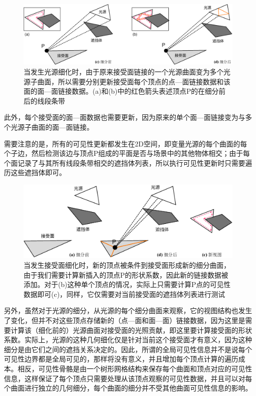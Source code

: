 \begin{figure}
\begin{fullwidth}
\includegraphics[width=\thewidth]{figures/r/source-refinement}
	\caption{当发生光源细化时，由于原来接受面链接的一个光源曲面变为多个光源子曲面，所以需要分别更新接受面每个顶点的点—面链接数据和该面的面—面链接数据。(a)和(b)中的红色箭头表述顶点P的在细分前后的线段条带}
	\label{f:r-source-refinement}
\end{fullwidth}
\end{figure}

此外，每个接受面的面—面数据也需要更新，因为原来的单个面—面链接变为与多个光源子曲面的面—面链接。

需要注意的是，所有的可见性更新都发生在2D空间，即变量光源的每个曲面的每个子边，然后检测该边与顶点P组成的平面是否与场景中的其他物体相交；由于每个面记录了与其所有线段条带相交的遮挡体列表，所以执行可见性更新时只需要遍历这些遮挡体即可。

\begin{figure}\includegraphics[width=1.\textwidth]{figures/r/receiver-refinement}
	\caption{当发生接受面细化时，新的顶点被条件到接受面形成新的细分曲面，由于我们需要计算新插入的顶点P的形状系数，因此新的链接数据被添加。对于(b)这种单个顶点的情况，实际上只需要计算P点的可见性数据即可(c)，同样，它仅需要对当前接受面的遮挡体列表进行测试}
	\label{f:r-receiver-refinement}
\end{figure}

另外，虽然对于光源的细分，从光源的每个细分曲面来观察，它的视图结构也发生了变化，但并不对这些顶点存储新的（点—面和面—面）链接数据，因为这里是需要计算该（细化前的）光源曲面对接受面的光照贡献，即这里要计算接受面的形状系数。实际上，光源的这种几何细化仅是针对当前这个接受面才有意义，因为这种细分是由它们之间的遮挡关系决定的。因此，所谓的全局可见性信息并不是说每个可见性边界都是全局可见的，那样将没有意义，并且增加每个顶点计算的遍历成本。相反，可见性骨骼是由一个树形网格结构来保存每个曲面和顶点对应的可见性信息，这样保证了每个顶点只需要处理从该顶点观察的可见性数据，并且可以对每个曲面进行独立的几何细分，每个曲面的细分并不受其他曲面可见性信息的影响。

